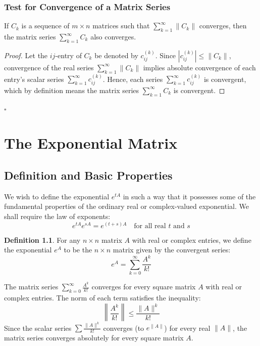 \documentclass[12pt,a4paper]{report}
\theoremstyle{definition}
\newtheorem{definition}[theorem]{Definition}
\numberwithin{equation}{chapter}
\begin{document}
\subsection*{Test for Convergence of a Matrix Series}
If $C_k$ is a sequence of $m \times n$ matrices such that $\sum_{k=1}^\infty \|C_k\|$ converges, then the matrix series $\sum_{k=1}^\infty C_k$ also converges.

\begin{proof}
Let the $ij$-entry of $C_k$ be denoted by $c_{ij}^{(k)}$. Since $|c_{ij}^{(k)}| \le \|C_k\|$, convergence of the real series $\sum_{k=1}^\infty \|C_k\|$ implies absolute convergence of each entry's scalar series $\sum_{k=1}^\infty c_{ij}^{(k)}$. Hence, each series $\sum_{k=1}^\infty c_{ij}^{(k)}$ is convergent, which by definition means the matrix series $\sum_{k=1}^\infty C_k$ is convergent.
\end{proof}
\hfill $\square$


\chapter{The Exponential Matrix}

\section{Definition and Basic Properties}
We wish to define the exponential $e^{tA}$ in such a way that it possesses some of the fundamental properties of the ordinary real or complex-valued exponential. We shall require the law of exponents:
\begin{equation}
e^{tA}e^{sA} = e^{(t+s)A} \quad \text{for all real } t \text{ and } s
\end{equation}

\begin{definition}
For any $n \times n$ matrix $A$ with real or complex entries, we define the exponential $e^A$ to be the $n \times n$ matrix given by the convergent series:
\begin{equation}
e^A = \sum_{k=0}^\infty \frac{A^k}{k!}
\end{equation}
\end{definition}
The matrix series $\sum_{k=0}^\infty \frac{A^k}{k!}$ converges for every square matrix $A$ with real or complex entries. The norm of each term satisfies the inequality:
\begin{equation}
\left\| \frac{A^k}{k!} \right\| \le \frac{\|A\|^k}{k!}
\end{equation}
Since the scalar series $\sum \frac{\|A\|^k}{k!}$ converges (to $e^{\|A\|}$) for every real $\|A\|$, the matrix series converges absolutely for every square matrix $A$.
\end{document}
